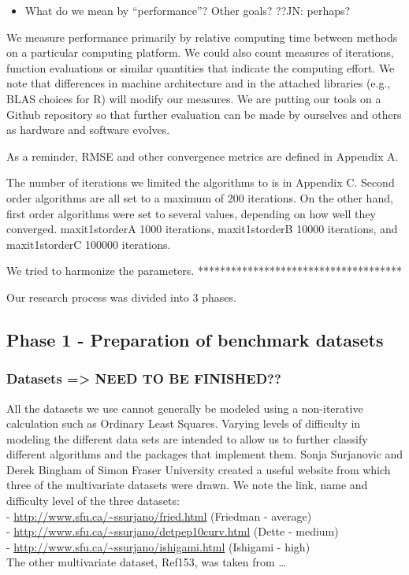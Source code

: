 \begin{itemize}
\tightlist
\item
  What do we mean by ``performance''? Other goals? ??JN: perhaps?
\end{itemize}

We measure performance primarily by relative computing time between
methods on a particular computing platform. We could also count measures
of iterations, function evaluations or similar quantities that indicate
the computing effort. We note that differences in machine architecture
and in the attached libraries (e.g., BLAS choices for R) will modify our
measures. We are putting our tools on a Github repository so that
further evaluation can be made by ourselves and others as hardware and
software evolves.

As a reminder, RMSE and other convergence metrics are defined in
Appendix A.

The number of iterations we limited the algorithms to is in Appendix C.
Second order algorithms are all set to a maximum of 200 iterations. On
the other hand, first order algorithms were set to several values,
depending on how well they converged. maxit1storderA 1000 iterations,
maxit1storderB 10000 iterations, and maxit1storderC 100000 iterations.

We tried to harmonize the parameters.
*************************************

Our research process was divided into 3 phases.

\hypertarget{phase-1---preparation-of-benchmark-datasets}{%
\subsection{Phase 1 - Preparation of benchmark
datasets}\label{phase-1---preparation-of-benchmark-datasets}}

\hypertarget{datasets-need-to-be-finished}{%
\subsubsection{Datasets =\textgreater{} NEED TO BE
FINISHED??}\label{datasets-need-to-be-finished}}

All the datasets we use cannot generally be modeled using a
non-iterative calculation such as Ordinary Least Squares. Varying levels
of difficulty in modeling the different data sets are intended to allow
us to further classify different algorithms and the packages that
implement them. Sonja Surjanovic and Derek Bingham of Simon Fraser
University created a useful website from which three of the multivariate
datasets were drawn. We note the link, name and difficulty level of the
three datasets:\\
- \url{http://www.sfu.ca/~ssurjano/fried.html} (Friedman - average)\\
- \url{http://www.sfu.ca/~ssurjano/detpep10curv.html} (Dette - medium)\\
- \url{http://www.sfu.ca/~ssurjano/ishigami.html} (Ishigami - high)\\
The other multivariate dataset, Ref153, was taken from \ldots{}

